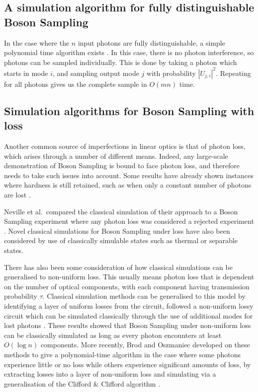 \subsection{A simulation algorithm for fully distinguishable Boson Sampling}
\label{ssec:fully-dist-sim}

In the case where the $n$ input photons are fully distinguishable, a simple polynomial time algorithm exists \cite{aaronson2014}. In this case, there is no photon interference, so photons can be sampled individually. This is done by taking a photon which starts in mode $i$, and sampling output mode $j$ with probability $|U_{j,i}|^2$. Repeating for all photons gives us the complete sample in $O(mn)$ time.

\subsection{Simulation algorithms for Boson Sampling with loss}
\label{ssec:simulating-lossy-bs}

Another common source of imperfections in linear optics is that of photon loss, which arises through a number of different means. 
Indeed, any large-scale demonstration of Boson Sampling is bound to face photon loss, and therefore needs to take such issues into account. 
Some results have already shown instances where hardness is still retained, such as when only a constant number of photons are lost \cite{aaronson2016,wang2018}.

Neville et al.\ compared the classical simulation of their approach to a Boson Sampling experiment where any photon loss was considered a rejected experiment \cite{neville2017}. Novel classical simulations for Boson Sampling under loss have also been considered by use of classically simulable states such as thermal \cite{garciapatron2017} or separable \cite{oszmaniec2018} states.

There has also been some consideration of how classical simulations can be generalised to non-uniform loss. 
This usually means photon loss that is dependent on the number of optical components, with each component having transmission probability $\tau$. 
Classical simulation methods can be generalised to this model by identifying a layer of uniform losses from the circuit, followed a non-uniform lossy circuit which can be simulated classically through the use of additional modes for lost photons \cite{garciapatron2017,oszmaniec2018}. 
These results showed that Boson Sampling under non-uniform loss can be classically simulated as long as every photon encounters at least $O(\log n)$ components. More recently, Brod and Oszmaniec developed on these methods to give a polynomial-time algorithm in the case where some photons experience little or no loss while others experience significant amounts of loss, by extracting losses into a layer of non-uniform loss and simulating via a generalisation of the Clifford \& Clifford algorithm \cite{brod2019}.

